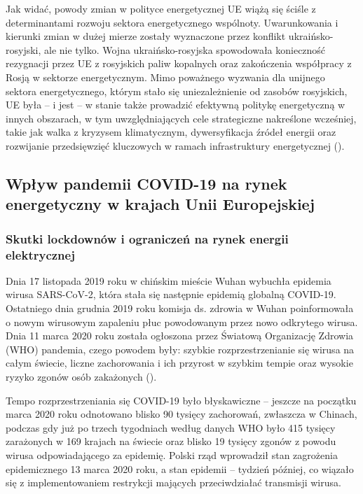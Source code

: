 \documentclass[polish, twoside, 12pt, a4paper]{article}
\theoremstyle{definition}
\theoremstyle{plain}
\theoremstyle{remark}
\begin{document}
Jak widać, powody zmian w polityce energetycznej UE wiążą się ściśle z determinantami rozwoju sektora energetycznego wspólnoty. Uwarunkowania i kierunki zmian w dużej mierze zostały wyznaczone przez konflikt ukraińsko-rosyjski, ale nie tylko. Wojna ukraińsko-rosyjska spowodowała konieczność rezygnacji przez UE z rosyjskich paliw kopalnych oraz zakończenia współpracy z Rosją w sektorze energetycznym. Mimo poważnego wyzwania dla unijnego sektora energetycznego, którym stało się uniezależnienie od zasobów rosyjskich, UE była – i jest – w stanie także prowadzić efektywną politykę energetyczną w innych obszarach, w tym uwzględniających cele strategiczne nakreślone wcześniej, takie jak walka z kryzysem klimatycznym, dywersyfikacja źródeł energii oraz rozwijanie przedsięwzięć kluczowych w ramach infrastruktury energetycznej (\cite{ep2023}). 



\subsection{Wpływ pandemii COVID-19 na rynek energetyczny w krajach Unii Europejskiej}
\subsubsection{Skutki lockdownów i ograniczeń na rynek energii elektrycznej}

Dnia 17 listopada 2019 roku w chińskim mieście Wuhan wybuchła epidemia wirusa SARS-CoV-2, która stała się następnie epidemią globalną COVID-19. Ostatniego dnia grudnia 2019 roku komisja ds. zdrowia w Wuhan poinformowała o nowym wirusowym zapaleniu płuc powodowanym przez nowo odkrytego wirusa. Dnia 11  marca  2020  roku  została  ogłoszona przez Światową Organizację Zdrowia (WHO) pandemia, czego powodem były: szybkie rozprzestrzenianie się wirusa na całym świecie, liczne zachorowania i ich przyrost w szybkim tempie oraz wysokie ryzyko zgonów osób zakażonych (\cite{gorska2023}).

Tempo rozprzestrzeniania się COVID-19 było błyskawiczne – jeszcze na początku marca 2020 roku odnotowano blisko 90 tysięcy zachorowań, zwłaszcza w Chinach, podczas gdy już po trzech tygodniach według danych WHO było 415 tysięcy zarażonych w 169 krajach na świecie oraz blisko 19 tysięcy zgonów z powodu wirusa odpowiadającego za epidemię. Polski rząd wprowadził stan zagrożenia epidemicznego 13 marca 2020 roku, a stan epidemii – tydzień później, co wiązało się z implementowaniem restrykcji mających przeciwdziałać transmisji wirusa. %
\end{document}
